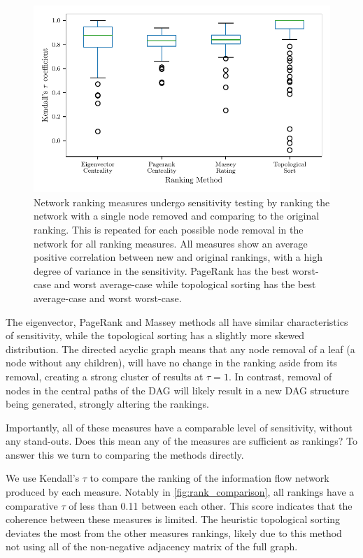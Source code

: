 \begin{figure}[!htbp]
\centering
\includegraphics{chapter4/figs/removal_ranking_boxplot.pdf}
\caption{Network ranking measures undergo sensitivity testing by ranking the network with a single node removed and comparing to the original ranking. This is repeated for each possible node removal in the network for all ranking measures. All measures show an average positive correlation between new and original rankings, with a high degree of variance in the sensitivity. PageRank has the best worst-case and worst average-case while topological sorting has the best average-case and worst worst-case.}\label{fig:rank_boxplots}
\end{figure}

The eigenvector, PageRank and Massey methods all have similar characteristics of sensitivity, while the topological sorting has a slightly more skewed distribution. The directed acyclic graph means that any node removal of a leaf (a node without any children), will have no change in the ranking aside from its removal, creating a strong cluster of results at $\tau=1$. In contrast, removal of nodes in the central paths of the DAG will likely result in a new DAG structure being generated, strongly altering the rankings.

Importantly, all of these measures have a comparable level of sensitivity, without any stand-outs. Does this mean any of the measures are sufficient as rankings? To answer this we turn to comparing the methods directly.

We use Kendall's $\tau$ to compare the ranking of the information flow network produced by each measure. Notably in \autoref{fig:rank_comparison}, all rankings have a comparative $\tau$ of less than 0.11 between each other. This score indicates that the coherence between these measures is limited. The heuristic topological sorting deviates the most from the other measures rankings, likely due to this method not using all of the non-negative adjacency matrix of the full graph.

